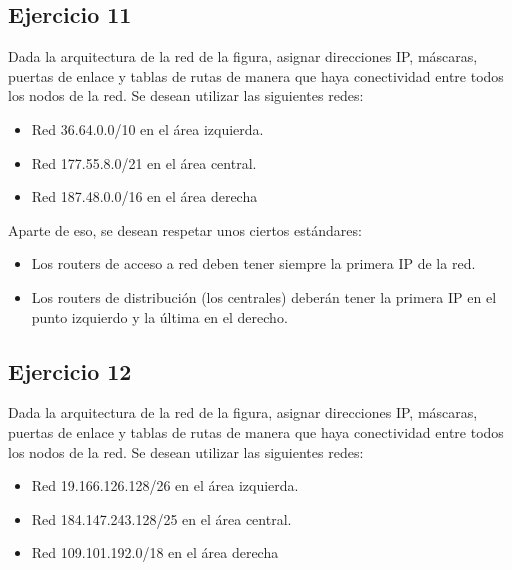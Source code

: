 \documentclass[letterpaper,10pt,spanish]{sphinxmanual}
\begin{document}
\subsection{Ejercicio 11}
\label{\detokenize{t2_integracion_elementos/ejercicios_subredes_ipv4/ejercicios_dos_router:ejercicio-11}}
\sphinxAtStartPar
Dada la arquitectura de la red de la figura, asignar direcciones IP, máscaras, puertas de enlace y tablas de rutas de manera que haya conectividad entre todos
los nodos de la red. Se desean utilizar las siguientes redes:
\begin{itemize}
\item {} 
\sphinxAtStartPar
Red 36.64.0.0/10 en el área izquierda.

\item {} 
\sphinxAtStartPar
Red 177.55.8.0/21 en el área central.

\item {} 
\sphinxAtStartPar
Red 187.48.0.0/16 en el área derecha

\end{itemize}

\begin{figure}[htbp]
\centering

\noindent{}
\end{figure}

\sphinxAtStartPar
Aparte de eso, se desean respetar unos ciertos estándares:
\begin{itemize}
\item {} 
\sphinxAtStartPar
Los routers de acceso a red deben tener siempre la primera IP de la red.

\item {} 
\sphinxAtStartPar
Los routers de distribución (los centrales) deberán tener la primera IP en el punto izquierdo y la última en el derecho.

\end{itemize}


\subsection{Ejercicio 12}
\label{\detokenize{t2_integracion_elementos/ejercicios_subredes_ipv4/ejercicios_dos_router:ejercicio-12}}
\sphinxAtStartPar
Dada la arquitectura de la red de la figura, asignar direcciones IP, máscaras, puertas de enlace y tablas de rutas de manera que haya conectividad entre todos
los nodos de la red. Se desean utilizar las siguientes redes:
\begin{itemize}
\item {} 
\sphinxAtStartPar
Red 19.166.126.128/26 en el área izquierda.

\item {} 
\sphinxAtStartPar
Red 184.147.243.128/25 en el área central.

\item {} 
\sphinxAtStartPar
Red 109.101.192.0/18 en el área derecha

\end{itemize}
\end{document}
